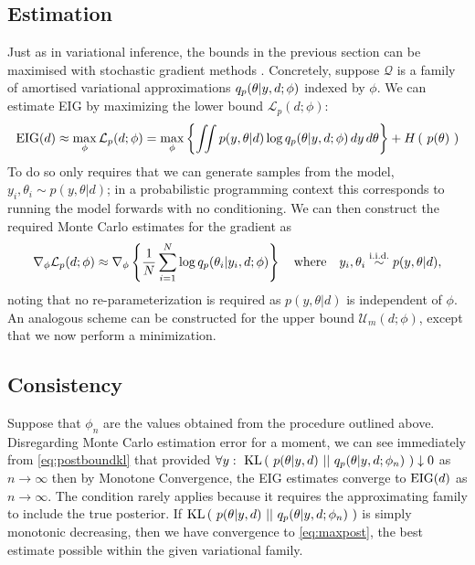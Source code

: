 \subsection{Estimation}
Just as in variational inference, the bounds in the previous section can be maximised with stochastic gradient methods \cite{robbins1951stochastic}. Concretely, suppose $\mathcal{Q}$ is a family of amortised variational approximations $q_p(\theta | y, d; \phi)$  indexed by $\phi$. We can estimate EIG by maximizing the lower bound $\mathcal{L}_p(d;\phi)$:
\begin{equation}
	\label{eq:maxpost}
	\text{EIG}(d) \approx \max_\phi \mathcal{L}_p(d;\phi) =
	\max_\phi \left\{ \iint p(y, \theta | d) \log q_p (\theta | y, d; \phi)\, dy\, d\theta  \right\} + H\left(\ p(\theta)\ \right)
\end{equation}
To do so only requires  that we can generate samples from the model,
$y_i, \theta_i \sim p(y, \theta | d)$; 
in a probabilistic programming context this corresponds to running the model forwards with no conditioning.
We can then construct the required Monte Carlo estimates for the gradient as
\begin{equation}
\nabla_{\phi} \mathcal{L}_p(d;\phi) \approx \nabla_\phi \left\{\frac{1}{N}\sum_{i=1}^N \log q_p(\theta_i|y_i, d; \phi)\right\} \quad \text{where} \quad y_i, \theta_i \overset{{\text{i.i.d.}}}{\sim} p(y, \theta | d),
\end{equation}
noting that no re-parameterization is required as $p(y,\theta|d)$ is independent of $\phi$.
An analogous scheme can be constructed for the upper bound $\mathcal{U}_m(d;\phi)$, except that we now
perform a minimization.

\subsection{Consistency}
Suppose that $\phi_n$ are the values obtained from the procedure outlined above. Disregarding Monte Carlo estimation error for a moment, we can see immediately from \eqref{eq:postboundkl} that provided $\forall y:\  \text{KL}\left(\ p(\theta | y, d)\ ||\ q_p(\theta|y, d; \phi_n)\ \right) \downarrow 0$ as $n \to \infty$ then by Monotone Convergence, the EIG estimates converge to $\text{EIG}(d)$ as $n \to \infty$. The condition rarely applies because it requires the approximating family to include the true posterior. If $\text{KL}\left(\ p(\theta | y, d)\ ||\ q_p(\theta|y, d; \phi_n)\ \right)$ is simply monotonic decreasing, then we have convergence to \eqref{eq:maxpost}, the best estimate possible within the given variational family.


